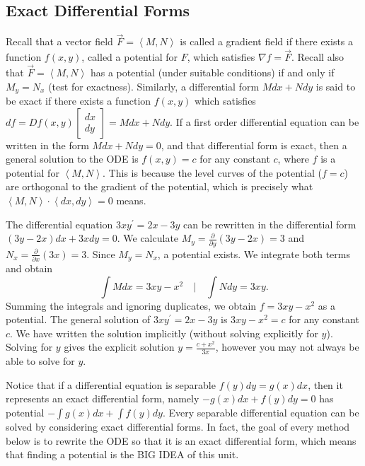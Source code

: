 \subsection{Exact Differential Forms}
Recall that a vector field $\vec F=\left<M,N\right>$ is called a gradient field if there exists a function $f(x,y)$, called a potential for $F$, which satisfies $\nabla f = \vec F$. Recall also that $\vec F=\left<M,N\right>$ has a potential (under suitable conditions) if and only if $M_y=N_x$ (test for exactness). Similarly, a differential form $Mdx+Ndy$ is said to be exact if there exists a function $f(x,y)$ which satisfies $df=Df(x,y)\begin{bmatrix}dx\\ dy\end{bmatrix}= Mdx+Ndy$. If a first order differential equation can be written in the form $Mdx+Ndy=0$, and that differential form is exact, then a general solution to the ODE is $f(x,y)=c$ for any constant $c$, where $f$ is a potential for $\left<M,N\right>$. 
This is because the level curves of the potential ($f=c$) are orthogonal to the gradient of the potential, which is precisely what $\left<M,N\right>\cdot\left<dx,dy\right>=0$ means. 

\begin{example}
The differential equation $3xy^\prime = 2x-3y$ can be rewritten in the differential form $(3y-2x)dx+3xdy=0$. We calculate $M_y=\frac{\partial}{\partial y}(3y-2x) = 3$ and $N_x=\frac{\partial}{\partial x}(3x) = 3$. Since $M_y=N_x$, a potential exists. We integrate both terms and obtain  
$$\int M dx = 3xy-x^2 \quad\bigg|\quad \int N dy = 3xy.$$ Summing the integrals and ignoring duplicates, we obtain $f=3xy-x^2$ as a potential.  The general solution of $3xy^\prime = 2x-3y$ is $3xy-x^2=c$ for any constant $c$. We have written the solution implicitly (without solving explicitly for $y$). Solving for $y$ gives the explicit solution $y=\frac{c+x^2}{3x}$, however you may not always be able to solve for $y$.  
\end{example}

Notice that if a differential equation is separable $f(y)dy=g(x)dx$, then it represents an exact differential form, namely $-g(x)dx+f(y)dy=0$ has potential $-\int g(x)dx + \int f(y)dy$.  Every separable differential equation can be solved by considering exact differential forms.  In fact, the goal of every method below is to rewrite the ODE so that it is an exact differential form, which means that finding a potential is the BIG IDEA of this unit.

